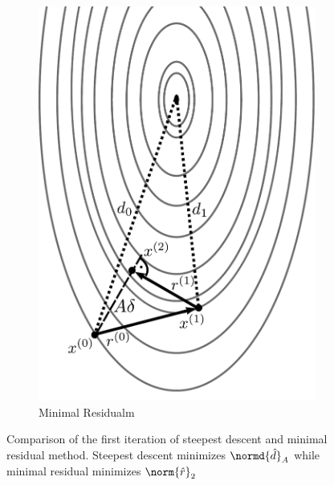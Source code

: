 \begin{figure}
\begin{subfigure}{.5\textwidth}
  \includegraphics[width=0.9\linewidth]{chapters/2_solvers/2_3_iterative_solvers/figures/mr.pdf}
  \caption{Minimal Residualm}
  \label{fig:mr}
\end{subfigure}
\caption{Comparison of the first iteration of steepest descent and minimal residual method. Steepest descent minimizes $\normd{\hat{d}}_A$ while minimal residual minimizes $\norm{\hat{r}}_2$}
\label{fig:one_d_projections}
\end{figure}


